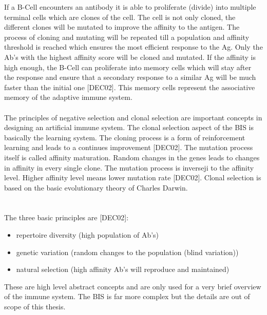 If a B-Cell encounters an antibody it is able to proliferate (divide) into multiple terminal cells which are clones of the cell. The cell is not only cloned, the different clones will be mutated to improve the affinity to the antigen. The process of cloning and mutating will be repeated till a population and affinity threshold is reached which ensures the most efficient response to the Ag. Only the Ab’s with the highest affinity score will be cloned and mutated. If the affinity is high enough, the B-Cell can proliferate into memory cells which will stay after the response and ensure that a secondary response to a similar Ag will be much faster than the initial one [DEC02]. This memory cells represent the associative memory of the adaptive immune system. 
\\\\
The principles of negative selection and clonal selection are important concepts in designing an artificial immune system. The clonal selection aspect of the BIS is basically the learning system. The cloning process is a form of reinforcement learning and leads to a continues improvement [DEC02].
The mutation process itself is called affinity maturation. Random changes in the genes leads to changes in affinity in every single clone. The mutation process is inverseji to the affinity level. Higher affinity level means lower mutation rate [DEC02].  
Clonal selection is based on the basic evolutionary theory of Charles Darwin.\\\\\\ The three basic principles are [DEC02]:
\\
\begin{itemize}
	\item 	repertoire diversity (high population of Ab’s)
	\item 	genetic variation (random changes to the population (blind variation))
	\item 	natural selection (high affinity Ab’s will reproduce and maintained) 
	
\end{itemize}

These are high level abstract concepts and are only used for a very brief overview of the immune system. The BIS is far more complex but the details are out of scope of this thesis.



